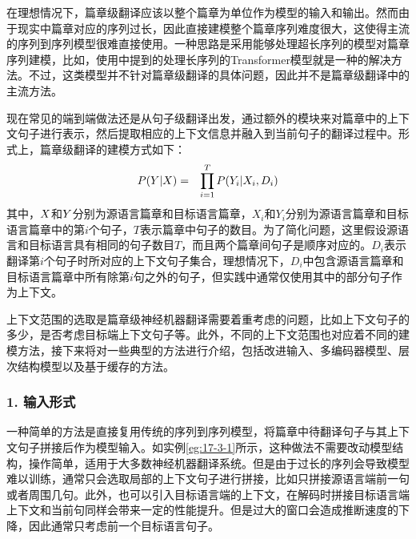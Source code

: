 \parinterval 在理想情况下，篇章级翻译应该以整个篇章为单位作为模型的输入和输出。然而由于现实中篇章对应的序列过长，因此直接建模整个篇章序列难度很大，这使得主流的序列到序列模型很难直接使用。一种思路是采用能够处理超长序列的模型对篇章序列建模，比如，使用{\chapterfifteen}中提到的处理长序列的Transformer模型就是一种的解决方法。不过，这类模型并不针对篇章级翻译的具体问题，因此并不是篇章级翻译中的主流方法。

\parinterval 现在常见的端到端做法还是从句子级翻译出发，通过额外的模块来对篇章中的上下文句子进行表示，然后提取相应的上下文信息并融入到当前句子的翻译过程中。形式上，篇章级翻译的建模方式如下：
\begin{eqnarray}
{P}({Y}|{X})&=&\prod_{i=1}^{T}{{P}(Y_i|X_i,D_i)}
\label{eq:17-3-1}
\end{eqnarray}
其中，${X}$和${Y}$分别为源语言篇章和目标语言篇章，$X_i$和$Y_i$分别为源语言篇章和目标语言篇章中的第$i$个句子，$T$表示篇章中句子的数目。为了简化问题，这里假设源语言和目标语言具有相同的句子数目$T$，而且两个篇章间句子是顺序对应的。$D_i$表示翻译第$i$个句子时所对应的上下文句子集合，理想情况下，$D_i$中包含源语言篇章和目标语言篇章中所有除第$i$句之外的句子，但实践中通常仅使用其中的部分句子作为上下文。

\parinterval 上下文范围的选取是篇章级神经机器翻译需要着重考虑的问题，比如上下文句子的多少，是否考虑目标端上下文句子等。此外，不同的上下文范围也对应着不同的建模方法，接下来将对一些典型的方法进行介绍，包括改进输入、多编码器模型、层次结构模型以及基于缓存的方法。


\subsubsection{1. 输入形式}

\parinterval 一种简单的方法是直接复用传统的序列到序列模型，将篇章中待翻译句子与其上下文句子拼接后作为模型输入。如实例\ref{eg:17-3-1}所示，这种做法不需要改动模型结构，操作简单，适用于大多数神经机器翻译系统。但是由于过长的序列会导致模型难以训练，通常只会选取局部的上下文句子进行拼接，比如只拼接源语言端前一句或者周围几句。此外，也可以引入目标语言端的上下文，在解码时拼接目标语言端上下文和当前句同样会带来一定的性能提升。但是过大的窗口会造成推断速度的下降，因此通常只考虑前一个目标语言句子。

